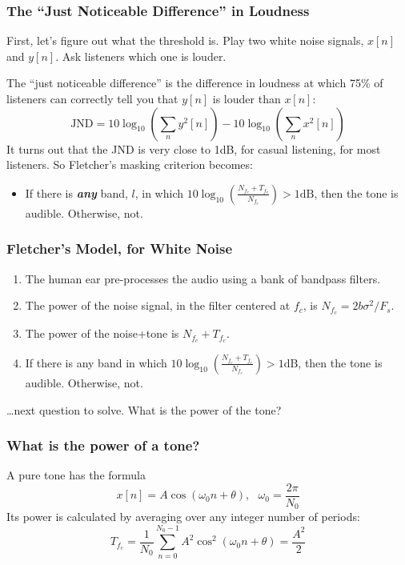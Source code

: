 \documentclass{beamer}
\begin{document}
\begin{frame}
  \frametitle{The ``Just Noticeable Difference'' in Loudness}

  First, let's figure out what the threshold is.  Play two white noise
  signals, $x[n]$ and $y[n]$.  Ask listeners which one is louder.

  The ``just noticeable difference'' is the difference in loudness at
  which 75\% of listeners can correctly tell you that $y[n]$ is louder than $x[n]$:
  \[
  \mbox{JND} = 10\log_{10}\left(\sum_n y^2[n]\right) - 10\log_{10}\left(\sum_n x^2[n]\right)
  \]
  It turns out that the JND is very close to 1dB, for casual
  listening, for most listeners.  So Fletcher's masking criterion becomes:
  \begin{itemize}
    \item If there is {\bf\em any} band, $l$, in which
      $10\log_{10}\left(\frac{N_{f_c}+T_{f_c}}{N_{f_c}}\right)>1\mbox{dB}$, then
      the tone is audible.  Otherwise, not.
  \end{itemize}
\end{frame}

\begin{frame}
  \frametitle{Fletcher's Model, for White Noise}

  \begin{enumerate}
  \item The human ear pre-processes  the audio using a bank of bandpass filters.
  \item The power of the noise signal, in the  filter centered at $f_c$, is $N_{f_c}=2b\sigma^2/F_s$.
  \item The power of the noise+tone is $N_{f_c}+T_{f_c}$.
  \item If there is any band in which
    $10\log_{10}\left(\frac{N_{f_c}+T_{f_c}}{N_{f_c}}\right)>1\mbox{dB}$, then
    the tone is audible.  Otherwise, not.
  \end{enumerate}
  \ldots next question to solve.  What is the power of the tone?
\end{frame}

\begin{frame}
  \frametitle{What is the power of a tone?}

  A pure tone has the formula
  \[
  x[n] = A\cos\left(\omega_0 n+\theta\right),~~~\omega_0=\frac{2\pi}{N_0}
  \]
  Its power is calculated by averaging over any integer number of
  periods:
  \[
  T_{f_c} = \frac{1}{N_0}\sum_{n=0}^{N_0-1} A^2\cos^2\left(\omega_0 n+\theta\right) = \frac{A^2}{2}
  \]
\end{frame}
\end{document}

